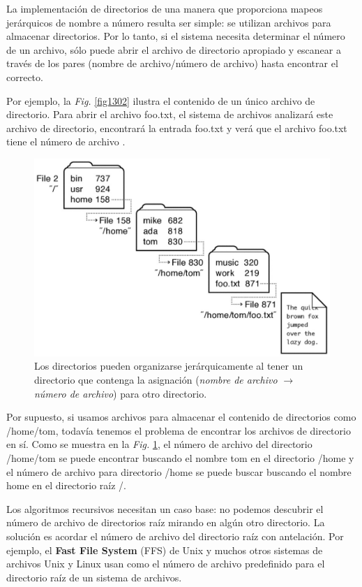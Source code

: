 \documentclass[10pt]{book}
\begin{document}
La implementación de directorios de una manera que proporciona mapeos jerárquicos de nombre a número resulta ser simple: se utilizan archivos para almacenar directorios. Por lo tanto, si el sistema necesita determinar el número de un archivo, sólo puede abrir el archivo de directorio apropiado y escanear a través de los pares (nombre de archivo/número de archivo) hasta encontrar el correcto.

Por ejemplo, la \textit{Fig.} \ref{fig1302} ilustra el contenido de un único archivo de directorio. Para abrir el archivo {\mf foo.txt}, el sistema de archivos analizará este archivo de directorio, encontrará la entrada {\mf foo.txt} y verá que el archivo {\mf foo.txt} tiene el número de archivo {}.

\begin{figure}[tbhp]
\centerline{\includegraphics[scale=0.45]{img/fig1303}}
\caption{Los directorios pueden organizarse jerárquicamente al tener un directorio que contenga la asignación (\textit{nombre de archivo} $\rightarrow$ \textit{número de archivo}) para otro directorio.}
\label{fig1303}
\end{figure}

Por supuesto, si usamos archivos para almacenar el contenido de directorios como {\mf /home/tom}, todavía tenemos el problema de encontrar los archivos de directorio en sí. Como se muestra en la \textit{Fig.} \ref{fig1303}, el número de archivo del directorio {\mf /home/tom} se puede encontrar buscando el nombre {\mf tom} en el directorio {\mf /home} y el número de archivo para directorio {\mf /home} se puede buscar buscando el nombre {\mf home} en el directorio raíz {\mf /}.

Los algoritmos recursivos necesitan un caso base: no podemos descubrir el número de archivo de directorios raíz mirando en algún otro directorio. La solución es acordar el número de archivo del directorio raíz con antelación. Por ejemplo, el \textbf{Fast File System} (FFS) de Unix y muchos otros sistemas de archivos Unix y Linux usan {} como el número de archivo predefinido para el directorio raíz de un sistema de archivos.
\end{document}
